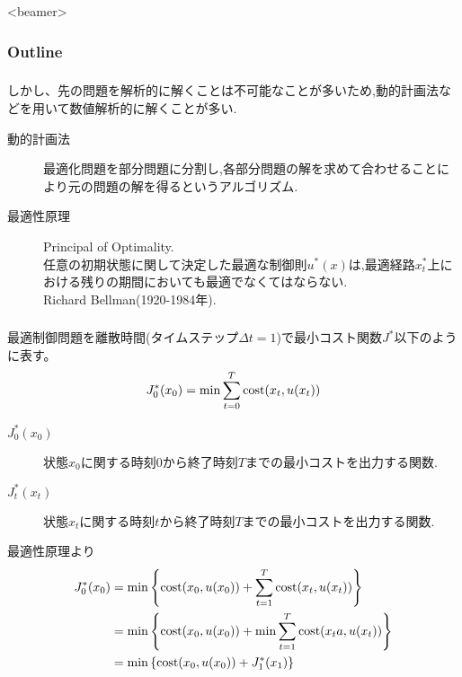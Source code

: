 \documentclass[dvipdfmx,12px]{beamer}
\begin{document}
  		\AtBeginSubsection[]{}
  		\begin{frame}<beamer>
  			\frametitle{Outline}
  		\end{frame}
			\begin{frame}
				\frametitle{\sectionTitleName{}}
				しかし、先の問題を解析的に解くことは不可能なことが多いため,動的計画法などを用いて数値解析的に解くことが多い.
				\begin{description}
					\item[動的計画法]
						最適化問題を部分問題に分割し,各部分問題の解を求めて合わせることにより元の問題の解を得るというアルゴリズム.
					\item[最適性原理]
						Principal of Optimality.\\
						任意の初期状態に関して決定した最適な制御則$u^{*}(x)$は,最適経路$x^{*}_t$上における残りの期間においても最適でなくてはならない.\\
						Richard Bellman(1920-1984年).
				\end{description}
			\end{frame}
			\begin{frame}
				\frametitle{\sectionTitleName{}}
				最適制御問題を離散時間(タイムステップ$\Delta t = 1$)で最小コスト関数$J^{*}$以下のように表す。
				\begin{align*}
					J^{*}_0 (x_0) = {\rm min} \sum_{t=0}^{T} {\rm cost}(x_t, u(x_t))
				\end{align*}
				\begin{description}
					\item[$J^{*}_0 (x_0)$] 状態$x_0$に関する時刻$0$から終了時刻$T$までの最小コストを出力する関数.
					\item[$J^{*}_t (x_t)$] 状態$x_t$に関する時刻$t$から終了時刻$T$までの最小コストを出力する関数.
				\end{description}
				最適性原理より
				\begin{align*}
					J^{*}_0 (x_0)
							&= {\rm min} \left\{ {\rm cost}(x_0, u(x_0)) 
									+ \sum_{t=1}^{T} {\rm cost}(x_t, u(x_t)) \right\} \\
							&= {\rm min} \left\{ {\rm cost}(x_0, u(x_0)) 
									+ {\rm min} \sum_{t=1}^{T} {\rm cost}(x_ta, u(x_t)) \right\} \\
							&= {\rm min} \left\{ {\rm cost}(x_0, u(x_0)) + J^{*}_1 (x_1) \right\}
				\end{align*}
			\end{frame}
\end{document}
